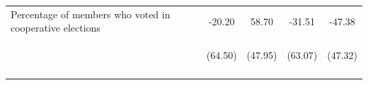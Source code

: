 \documentclass[11pt]{article}
\begin{document}
\begin{table}[H]
{\begin{tabularx}{1.3\linewidth}{lcccc}
\noalign{\smallskip}Percentage of members who voted in cooperative elections & -20.20 & 58.70 & -31.51 & -47.38\\
 & \begin{footnotesize}(64.50)\end{footnotesize} & \begin{footnotesize}(47.95)\end{footnotesize} & \begin{footnotesize}(63.07)\end{footnotesize} & \begin{footnotesize}(47.32)\end{footnotesize}\\
\noalign{\smallskip}\hline
  \end{tabularx}}
\end{table}
\doublespacing
\end{document}
